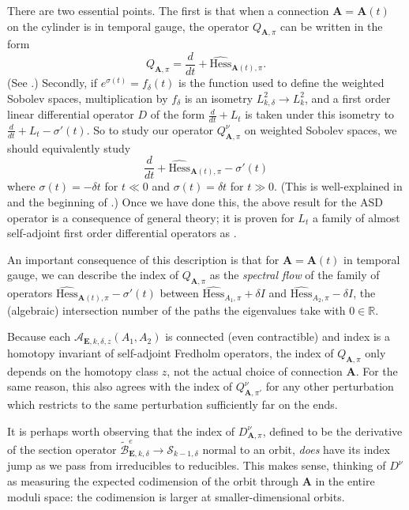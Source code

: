 \documentclass[10pt,a4paper]{amsart}
\theoremstyle{definition}
\theoremstyle{remark}
\numberwithin{figure}{qchap}
\begin{document}
There are two essential points. The first is that when a connection $\mathbf{A} = \mathbf{A}(t)$ on the cylinder is in temporal gauge, the operator $Q_{\mathbf{A},\pi}$ can be written in the form $$Q_{\mathbf{A}, \pi} = \frac{d}{dt} + \widehat{\text{Hess}}_{\mathbf{A}(t), \pi}.$$ (See \cite[Section~2.5]{Don}.) Secondly, if $e^{\sigma(t)} = f_\delta(t)$ is the function used to define the weighted Sobolev spaces, multiplication by $f_\delta$ is an isometry $L^2_{k,\delta} \to L^2_k$, and a first order linear differential operator $D$ of the form $\frac{d}{dt} + L_t$ is taken under this isometry to $\frac{d}{dt} + L_t - \sigma'(t)$. So to study our operator $Q^\nu_{\mathbf{A},\pi}$ on weighted Sobolev spaces, we should equivalently study 
$$\frac{d}{dt} + \widehat{\text{Hess}}_{\mathbf{A}(t),\pi} - \sigma'(t)$$ 
where $\sigma(t) = -\delta t$ for $t \ll 0$ and $\sigma(t) = \delta t$ for $t \gg 0$. (This is well-explained in \cite[Section~3.3.1]{Don} and the beginning of \cite[Section~3.3]{Lin}.) Once we have done this, the above result for the ASD operator is a consequence of general theory; it is proven for $L_t$ a family of almost self-adjoint first order differential operators as \cite[Proposition~14.2.1]{KMSW}.

An important consequence of this description is that for $\mathbf{A} = \mathbf{A}(t)$ in temporal gauge, we can describe the index of $Q_{\mathbf{A},\pi}$ as the \textit{spectral flow} of the family of operators $\widehat{\text{Hess}}_{\mathbf{A}(t), \pi} - \sigma'(t)$ between $\widehat{\text{Hess}}_{A_1, \pi} + \delta I$ and $\widehat{\text{Hess}}_{A_2, \pi} - \delta I$, the (algebraic) intersection number of the paths the eigenvalues take with $0 \in \mathbb R$. 

Because each $\mathcal A_{\mathbf{E},k,\delta,z}(A_1,A_2)$ is connected (even contractible) and index is a homotopy invariant of self-adjoint Fredholm operators, the index of $Q_{\mathbf{A},\pi}$ only depends on the homotopy class $z$, not the actual choice of connection $\mathbf{A}$. For the same reason, this also agrees with the index of $Q^\nu_{\mathbf{A},\pi'}$ for any other perturbation which restricts to the same perturbation sufficiently far on the ends. 

It is perhaps worth observing that the index of $D^\nu_{\mathbf{A},\pi}$, defined to be the derivative of the section operator $\widetilde{\mathcal B}^e_{\mathbf{E},k,\delta} \to \mathcal S_{k-1,\delta}$ normal to an orbit, \emph{does} have its index jump as we pass from irreducibles to reducibles. This makes sense, thinking of $D^\nu$ as measuring the expected codimension of the orbit through $\mathbf{A}$ in the entire moduli space: the codimension is larger at smaller-dimensional orbits.
\end{document}
